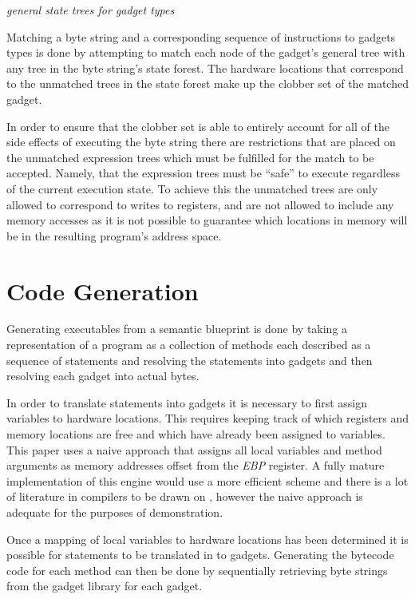     \emph{general state trees for gadget types}

    Matching a byte string and a corresponding sequence of instructions to
    gadgets types is done by attempting to match each node of the gadget's
    general tree with any tree in the byte string's state forest. The hardware
    locations that correspond to the unmatched trees in the state forest make up
    the clobber set of the matched gadget.

    In order to ensure that the clobber set is able to entirely account for all
    of the side effects of executing the byte string there are restrictions that
    are placed on the unmatched expression trees which must be fulfilled for the
    match to be accepted. Namely, that the expression trees must be ``safe'' to
    execute regardless of the current execution state. To achieve this the
    unmatched trees are only allowed to correspond to writes to registers, and
    are not allowed to include any memory accesses as it is not possible to
    guarantee which locations in memory will be in the resulting program's
    address space.

    \section{Code Generation}

    Generating executables from a semantic blueprint is done by taking a
    representation of a program as a collection of methods each described as a
    sequence of statements and resolving the statements into gadgets and then
    resolving each gadget into actual bytes.

    In order to translate statements into gadgets it is necessary to first
    assign variables to hardware locations. This requires keeping track of which
    registers and memory locations are free and which have already been assigned
    to variables. This paper uses a naive approach that assigns all local
    variables and method arguments as memory addresses offset from the
    \emph{EBP} register. A fully mature implementation of this engine would use
    a more efficient scheme and there is a lot of literature in compilers to be
    drawn on \cite{COMPILER-REGISTER-MAPPING}, however the naive approach is
    adequate for the purposes of demonstration.


    Once a mapping of local variables to hardware locations has been determined
    it is possible for statements to be translated in to gadgets. Generating the
    bytecode code for each method can then be done by sequentially retrieving
    byte strings from the gadget library for each gadget. 

